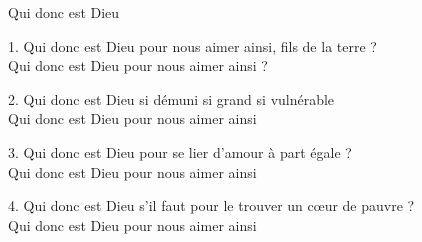 Qui donc est Dieu

1. Qui donc est Dieu pour nous aimer ainsi, fils de la terre ?\\
Qui donc est Dieu pour nous aimer ainsi ?

2. Qui donc est Dieu si démuni si grand si vulnérable\\
Qui donc est Dieu pour nous aimer ainsi

3. Qui donc est Dieu pour se lier d’amour à part égale ?\\
Qui donc est Dieu pour nous aimer ainsi

4. Qui donc est Dieu s’il faut pour le trouver un cœur de pauvre ?\\
Qui donc est Dieu pour nous aimer ainsi

